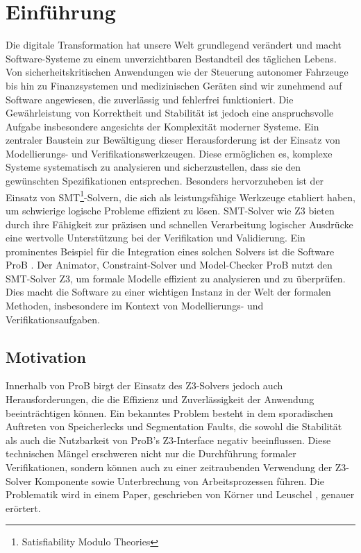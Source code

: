 


\section{Einführung}

Die digitale Transformation hat unsere Welt grundlegend verändert und macht Software-Systeme zu einem unverzichtbaren Bestandteil des täglichen Lebens.
Von sicherheitskritischen Anwendungen wie der Steuerung autonomer Fahrzeuge bis hin zu Finanzsystemen und medizinischen Geräten sind wir zunehmend auf Software angewiesen,
die zuverlässig und fehlerfrei funktioniert.
Die Gewährleistung von Korrektheit und Stabilität ist jedoch eine anspruchsvolle Aufgabe
insbesondere angesichts der Komplexität moderner Systeme.
Ein zentraler Baustein zur Bewältigung dieser Herausforderung ist der Einsatz von Modellierungs- und Verifikationswerkzeugen.
Diese ermöglichen es, komplexe Systeme systematisch zu analysieren und sicherzustellen,
dass sie den gewünschten Spezifikationen entsprechen.
Besonders hervorzuheben ist der Einsatz von SMT\footnote{Satisfiability Modulo Theories}-Solvern,
die sich als leistungsfähige Werkzeuge etabliert haben,
um schwierige logische Probleme effizient zu lösen.
SMT-Solver wie Z3 \cite{10.1007/978-3-540-78800-3_24} bieten durch ihre Fähigkeit zur präzisen und schnellen Verarbeitung logischer Ausdrücke eine wertvolle Unterstützung bei der Verifikation und Validierung.
Ein prominentes Beispiel für die Integration eines solchen Solvers ist die Software ProB \cite{leuschel2003prob}.
Der Animator, Constraint-Solver und Model-Checker ProB nutzt den SMT-Solver Z3, um formale Modelle effizient zu analysieren und zu überprüfen.
Dies macht die Software zu einer wichtigen Instanz in der Welt der formalen Methoden,
insbesondere im Kontext von Modellierungs- und Verifikationsaufgaben.

\subsection{Motivation}

Innerhalb von ProB birgt der Einsatz des Z3-Solvers jedoch auch Herausforderungen, die die Effizienz und Zuverlässigkeit der Anwendung beeinträchtigen können.
Ein bekanntes Problem besteht in dem sporadischen Auftreten von Speicherlecks und Segmentation Faults,
die sowohl die Stabilität als auch die Nutzbarkeit von ProB's Z3-Interface negativ beeinflussen.
Diese technischen Mängel erschweren nicht nur die Durchführung formaler Verifikationen,
sondern können auch zu einer zeitraubenden Verwendung der Z3-Solver Komponente sowie Unterbrechung von Arbeitsprozessen führen.
Die Problematik wird in einem Paper, geschrieben von Körner und Leuschel \cite{10.1007/978-3-031-25803-9_5}, genauer erörtert.

